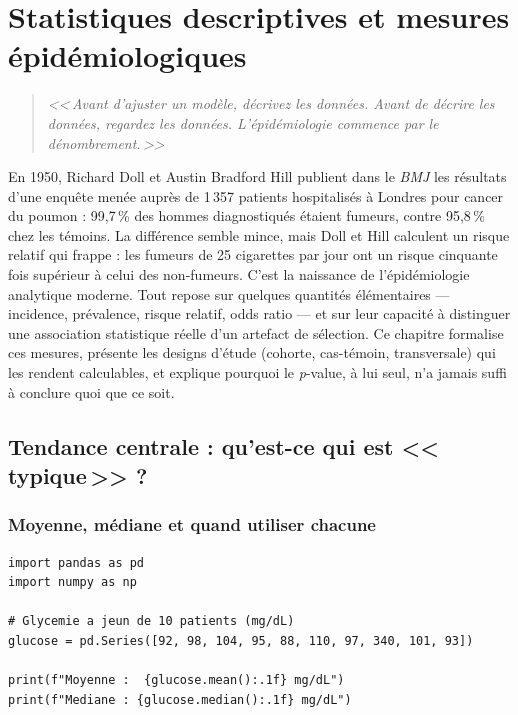 \chapter{Statistiques descriptives et mesures \'epid\'emiologiques}
\label{ch:statistiques-epi}

\begin{quote}
\emph{<<\,Avant d'ajuster un mod\`ele, d\'ecrivez les donn\'ees. Avant de d\'ecrire les donn\'ees, regardez les donn\'ees. L'\'epid\'emiologie commence par le d\'enombrement.\,>>}
\end{quote}

En 1950, Richard Doll et Austin Bradford Hill publient dans le \emph{BMJ} les résultats d'une enquête menée auprès de 1\,357 patients hospitalisés à Londres pour cancer du poumon : 99,7\,\% des hommes diagnostiqués étaient fumeurs, contre 95,8\,\% chez les témoins. La différence semble mince, mais Doll et Hill calculent un risque relatif qui frappe : les fumeurs de 25 cigarettes par jour ont un risque cinquante fois supérieur à celui des non-fumeurs. C'est la naissance de l'épidémiologie analytique moderne. Tout repose sur quelques quantités élémentaires --- incidence, prévalence, risque relatif, odds ratio --- et sur leur capacité à distinguer une association statistique réelle d'un artefact de sélection. Ce chapitre formalise ces mesures, présente les designs d'étude (cohorte, cas-témoin, transversale) qui les rendent calculables, et explique pourquoi le \emph{p}-value, à lui seul, n'a jamais suffi à conclure quoi que ce soit.

\section{Tendance centrale : qu'est-ce qui est <<\,typique\,>> ?}

\subsection{Moyenne, m\'ediane et quand utiliser chacune}

\begin{verbatim}
import pandas as pd
import numpy as np

# Glycemie a jeun de 10 patients (mg/dL)
glucose = pd.Series([92, 98, 104, 95, 88, 110, 97, 340, 101, 93])

print(f"Moyenne :  {glucose.mean():.1f} mg/dL")
print(f"Mediane : {glucose.median():.1f} mg/dL")
\end{verbatim}


